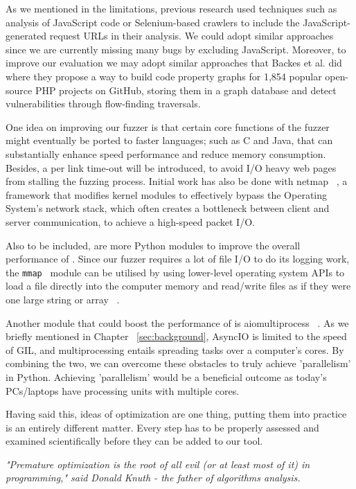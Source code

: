As we mentioned in the limitations, previous research used techniques such as analysis of JavaScript code or Selenium-based crawlers to include the JavaScript-generated request URLs in their analysis. We could adopt similar approaches since we are currently missing many bugs by excluding JavaScript. Moreover, to improve our evaluation we may adopt similar approaches that Backes et al. did  ~\cite{efficient2017} where they propose a way to build code property graphs for 1,854 popular open-source PHP projects on GitHub, storing them in a graph database and detect vulnerabilities through flow-finding traversals.

One idea on improving our fuzzer is that certain core functions of the
fuzzer might eventually be ported to faster languages; such as C and Java, that can substantially enhance speed performance and reduce memory consumption. Besides, a per link time-out will be introduced, to avoid I/O heavy web pages from stalling the fuzzing process. Initial work has also be done with netmap  ~\cite{rizzo2011Netmap}, a framework that modifies kernel modules to effectively bypass the Operating System's network stack, which often creates a bottleneck between client and server communication, to achieve a high-speed packet I/O.

Also to be included, are more Python modules to improve the overall performance of \pname{}. Since our fuzzer requires a lot of file I/O to do its logging work, the {\tt mmap } module can be utilised by using lower-level operating system APIs to load a file directly into the computer memory and read/write files as if they were one large string or array ~\cite{mmap}. 

Another module that could boost the performance of \pname{} is aiomultiprocess ~\cite{aiomultiprocess}. As we briefly mentioned in Chapter ~\ref{sec:background}, AsyncIO is limited to the speed of GIL, and multiprocessing entails spreading tasks over a computer's cores. By combining the two, we can overcome these obstacles to truly achieve 'parallelism' in Python. Achieving 'parallelism' would be a beneficial outcome as today's PCs/laptops have processing units with multiple cores.

Having said this, ideas of optimization are one thing, putting them into practice is an entirely different matter. Every step has to be properly assessed and examined scientifically before they can be added to our tool.

\textit{"Premature optimization is the root of all evil (or at least most of it) in programming," said Donald Knuth - the father of algorithms analysis.}
